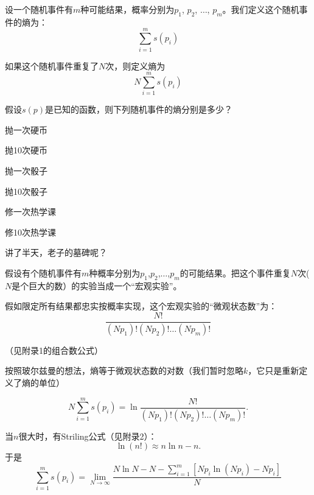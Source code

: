 \documentclass[CJK]{beamer}
\begin{document}
\begin{frame}
\bchL

设一个随机事件有$m$种可能结果，概率分别为$p_1$, $p_2$, $\ldots$, $p_m$。我们定义这个随机事件的熵为：
$$\sum_{i=1}^m  s(p_i)$$

如果这个随机事件重复了$N$次，则定义熵为
$$N \sum_{i=1}^m  s(p_i)$$

\echL
\end{frame}


\begin{frame}
\bchL
假设$s(p)$是已知的函数，则下列随机事件的熵分别是多少？
\bitem
\item{抛一次硬币}
\item{抛10次硬币}  
\item{抛一次骰子}  
\item{抛10次骰子}
\item{修一次热学课}
\item{修10次热学课}    
\eitem

\echL
\end{frame}


\begin{frame}
\bchL


\bcenter
讲了半天，老子的墓碑呢？
\ecenter
\echL
\end{frame}


\begin{frame}
\bchL

假设有个随机事件有$m$种概率分别为$p_1$,$p_2$,$\ldots$,$p_m$的可能结果。把这个事件重复$N$次($N$是个巨大的数）的实验当成一个``宏观实验''。

{\blue 假如限定所有结果都忠实按概率实现}，这个宏观实验的``微观状态数''为：
$$\frac{N!}{(Np_1)!(Np_2)!\ldots(Np_m)!}$$

（见附录1的组合数公式）

\echL
\end{frame}

\begin{frame}
\bchL
按照玻尔兹曼的想法，熵等于微观状态数的对数（我们暂时忽略$k$，它只是重新定义了熵的单位）

$$N\sum_{i=1}^m s(p_i) = \ln \frac{N!}{(Np_1)!(Np_2)!\ldots(Np_m)!}.$$


\echL
\end{frame}


\begin{frame}
\bch
{\large
当$n$很大时，有Striling公式（见附录2）：
$$ \ln (n!) \approx n\ln n - n .$$
于是
}
$$\sum_{i=1}^m s(p_i) = \lim_{N\rightarrow\infty} \frac{N\ln N - N - \sum_{i=1}^m \left[Np_i \ln (Np_i) - Np_i\right] }{N}$$

\ech
\end{frame}
\end{document}
